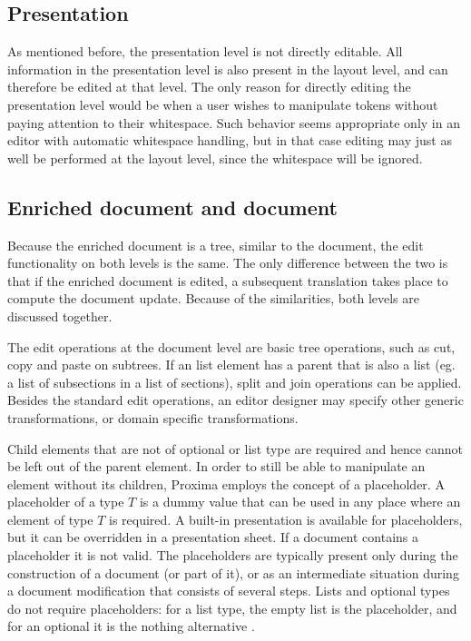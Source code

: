  
%									
\subsection{Presentation}

As mentioned before, the presentation level is not directly editable. All information in the presentation level is also present in the layout level, and can therefore be edited at that level. The only reason for directly editing the presentation level would be when a user wishes to manipulate tokens without paying attention to their whitespace. Such behavior seems appropriate only in an editor with automatic whitespace handling, but in that case editing may just as well be performed at the layout level, since the whitespace will be ignored. 
 
 
%									
\subsection{Enriched document and document}

Because the enriched document is a tree, similar to the document, the edit functionality on both levels is the same. The only difference between the two is that if the enriched document is edited, a subsequent translation takes place to compute the document update. Because of the similarities, both levels are discussed together.

The edit operations at the document level are basic tree operations, such as cut, copy and paste on subtrees. If an list element has a parent that is also a list (eg. a list of subsections in a list of sections), split and join operations can be applied. Besides the standard edit operations, an editor designer may specify other generic transformations, or domain specific transformations. 

Child elements that are not of optional or list type are required and hence cannot be left out of the parent element. In order to still be able to manipulate an element without its children, Proxima employs the concept of a placeholder. A placeholder of a type $T$ is a dummy value that can be used in any place where an element of type $T$ is required. A built-in presentation is available for placeholders, but it can be overridden in a presentation sheet. If a document contains a placeholder it is not valid. The placeholders are typically present only during the construction of a document (or part of it), or as an intermediate situation during a document modification that consists of several steps. Lists and optional types do not require placeholders: for a list type, the empty list is the placeholder, and for an optional it is the nothing alternative .


